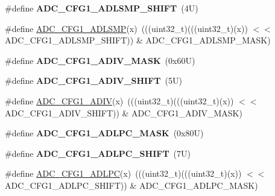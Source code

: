 \begin{DoxyCompactItemize}
\#define {\bfseries A\+D\+C\+\_\+\+C\+F\+G1\+\_\+\+A\+D\+L\+S\+M\+P\+\_\+\+S\+H\+I\+FT}~(4\+U)
\item 
\#define \mbox{\hyperlink{group___a_d_c___register___masks_ga83a0b2b8e5d22c85bc752995eadc23c8}{A\+D\+C\+\_\+\+C\+F\+G1\+\_\+\+A\+D\+L\+S\+MP}}(x)~(((uint32\+\_\+t)(((uint32\+\_\+t)(x)) $<$$<$ A\+D\+C\+\_\+\+C\+F\+G1\+\_\+\+A\+D\+L\+S\+M\+P\+\_\+\+S\+H\+I\+FT)) \& A\+D\+C\+\_\+\+C\+F\+G1\+\_\+\+A\+D\+L\+S\+M\+P\+\_\+\+M\+A\+SK)
\item 
\mbox{\label{group___a_d_c___register___masks_gaffbe8246d864b7889a3ce04b94e6d948}} 
\#define {\bfseries A\+D\+C\+\_\+\+C\+F\+G1\+\_\+\+A\+D\+I\+V\+\_\+\+M\+A\+SK}~(0x60\+U)
\item 
\mbox{\label{group___a_d_c___register___masks_gacbe42773bc1f15c2870c2422c89bfe67}} 
\#define {\bfseries A\+D\+C\+\_\+\+C\+F\+G1\+\_\+\+A\+D\+I\+V\+\_\+\+S\+H\+I\+FT}~(5\+U)
\item 
\#define \mbox{\hyperlink{group___a_d_c___register___masks_ga7407a87e3d32012930901336c97b7694}{A\+D\+C\+\_\+\+C\+F\+G1\+\_\+\+A\+D\+IV}}(x)~(((uint32\+\_\+t)(((uint32\+\_\+t)(x)) $<$$<$ A\+D\+C\+\_\+\+C\+F\+G1\+\_\+\+A\+D\+I\+V\+\_\+\+S\+H\+I\+FT)) \& A\+D\+C\+\_\+\+C\+F\+G1\+\_\+\+A\+D\+I\+V\+\_\+\+M\+A\+SK)
\item 
\mbox{\label{group___a_d_c___register___masks_ga308bdf4f339315924bd36b1f2aa3d254}} 
\#define {\bfseries A\+D\+C\+\_\+\+C\+F\+G1\+\_\+\+A\+D\+L\+P\+C\+\_\+\+M\+A\+SK}~(0x80\+U)
\item 
\mbox{\label{group___a_d_c___register___masks_ga15e7cf514347ab7f32e2104b1776704e}} 
\#define {\bfseries A\+D\+C\+\_\+\+C\+F\+G1\+\_\+\+A\+D\+L\+P\+C\+\_\+\+S\+H\+I\+FT}~(7\+U)
\item 
\#define \mbox{\hyperlink{group___a_d_c___register___masks_ga614be72cb30e582c26d0b006b1aa9480}{A\+D\+C\+\_\+\+C\+F\+G1\+\_\+\+A\+D\+L\+PC}}(x)~(((uint32\+\_\+t)(((uint32\+\_\+t)(x)) $<$$<$ A\+D\+C\+\_\+\+C\+F\+G1\+\_\+\+A\+D\+L\+P\+C\+\_\+\+S\+H\+I\+FT)) \& A\+D\+C\+\_\+\+C\+F\+G1\+\_\+\+A\+D\+L\+P\+C\+\_\+\+M\+A\+SK)
\end{DoxyCompactItemize}

